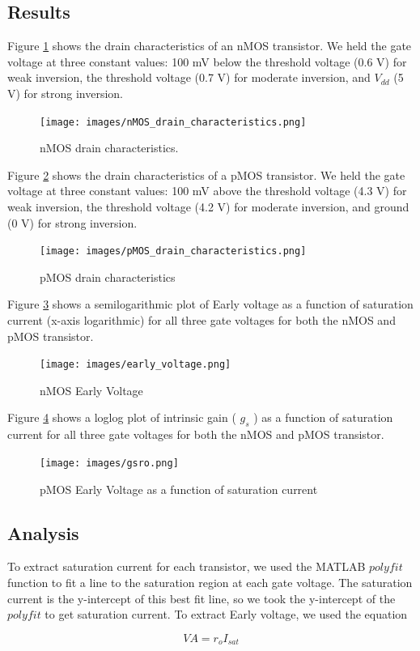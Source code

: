 \documentclass{article}
\begin{document}
\subsection{Results}

Figure \ref{fig:nMOS_char} shows the drain characteristics of an nMOS transistor. We held the gate voltage at three constant values: 100 mV below the threshold voltage (0.6 V) for weak inversion, the threshold voltage (0.7 V) for moderate inversion, and $V_{dd}$ (5 V) for strong inversion. 
\begin{figure}[H]   
  \centering      
  \texttt{[image: images/nMOS\_drain\_characteristics.png]}
  \caption{nMOS drain characteristics. }   
  \label{fig:nMOS_char}
\end{figure}

Figure \ref{fig:pMOS_char} shows the drain characteristics of a pMOS transistor. We held the gate voltage at three constant values: 100 mV above the threshold voltage (4.3 V) for weak inversion, the threshold voltage (4.2 V) for moderate inversion, and ground (0 V) for strong inversion. 

\begin{figure}[H]   
  \centering        
  \texttt{[image: images/pMOS\_drain\_characteristics.png]}
  \caption{pMOS drain characteristics}   
  \label{fig:pMOS_char}
\end{figure}

Figure \ref{fig:early} shows a semilogarithmic plot of Early voltage as a function of saturation current (x-axis logarithmic) for all three gate voltages for both the nMOS and pMOS transistor.

\begin{figure}[H]   
  \centering        
  \texttt{[image: images/early\_voltage.png]}
  \caption{nMOS Early Voltage}   
  \label{fig:early}
\end{figure}

Figure \ref{fig:gsro} shows a loglog plot of intrinsic gain ( $g_s$ ) as a function of saturation current for all three gate voltages for both the nMOS and pMOS transistor.

\begin{figure}[H]   
  \centering        
  \texttt{[image: images/gsro.png]}
  \caption{pMOS Early Voltage as a function of saturation current}   
  \label{fig:gsro}
\end{figure}

\subsection{Analysis}
\flushleft
To extract saturation current for each transistor, we used the MATLAB $polyfit$ function to fit a line to the saturation region at each gate voltage. The saturation current is the y-intercept of this best fit line, so we took the y-intercept of the $polyfit$ to get saturation current.
To extract Early voltage, we used the equation
\begin{centering}
$$VA = r_o I_{sat}$$
\end{centering}
\end{document}

